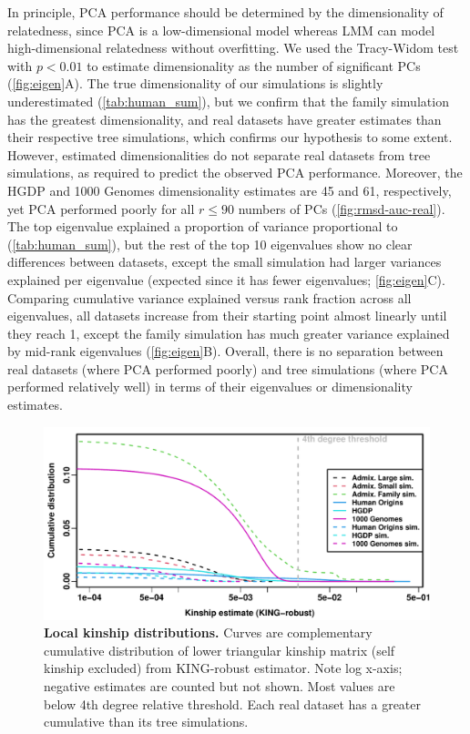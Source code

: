 \documentclass[11pt]{article}
\begin{document}
\begin{linenumbers}
In principle, PCA performance should be determined by the dimensionality of relatedness, since PCA is a low-dimensional model whereas LMM can model high-dimensional relatedness without overfitting.
We used the Tracy-Widom test \citep{patterson_population_2006} with $p < 0.01$ to estimate dimensionality as the number of significant PCs (\cref{fig:eigen}A).
The true dimensionality of our simulations is slightly underestimated (\cref{tab:human_sum}), but we confirm that the family simulation has the greatest dimensionality, and real datasets have greater estimates than their respective tree simulations, which confirms our hypothesis to some extent.
However, estimated dimensionalities do not separate real datasets from tree simulations, as required to predict the observed PCA performance.
Moreover, the HGDP and 1000 Genomes dimensionality estimates are 45 and 61, respectively, yet PCA performed poorly for all $r \le 90$ numbers of PCs (\cref{fig:rmsd-auc-real}).
The top eigenvalue explained a proportion of variance proportional to \Fst (\cref{tab:human_sum}), but the rest of the top 10 eigenvalues show no clear differences between datasets, except the small simulation had larger variances explained per eigenvalue (expected since it has fewer eigenvalues; \cref{fig:eigen}C).
Comparing cumulative variance explained versus rank fraction across all eigenvalues, all datasets increase from their starting point almost linearly until they reach 1, except the family simulation has much greater variance explained by mid-rank eigenvalues (\cref{fig:eigen}B).
Overall, there is no separation between real datasets (where PCA performed poorly) and tree simulations (where PCA performed relatively well) in terms of their eigenvalues or dimensionality estimates.

\begin{figure}[b!]
  \centering
  \includegraphics[width=\textwidth]{king_log-x.pdf}
  \caption{
    {\bf Local kinship distributions.}
    Curves are complementary cumulative distribution of lower triangular kinship matrix (self kinship excluded) from KING-robust estimator.
    Note log x-axis; negative estimates are counted but not shown.
    Most values are below 4th degree relative threshold.
    Each real dataset has a greater cumulative than its tree simulations.
  }
  \label{fig:king}
\end{figure}


\end{linenumbers}
\end{document}
